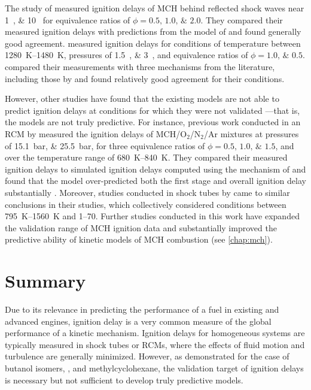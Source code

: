 \documentclass[../main.tex]{subfiles}
\begin{document}
The study of \textcite{Rotavera2013} measured ignition delays of MCH behind
reflected shock waves near \SIlist{1;10}{\atmosphere} for equivalence
ratios of $\phi = \numlist{0.5;1.0;2.0}$. They compared their measured ignition
delays with predictions from the model of \textcite{Pitz2007} and found
generally good agreement. \textcite{Hong2011} measured ignition delays
for conditions of temperature between \SIrange{1280}{1480}{\kelvin}, pressures
of \SIlist{1.5;3}{\atmosphere}, and equivalence ratios of $\phi = \numlist{1.0;0.5}$.
\textcite{Hong2011} compared their measurements with three mechanisms
from the literature, including those by \textcite{Pitz2007, Orme2006}
and found relatively good agreement for their conditions.

However, other studies have found that the existing models are not able
to predict ignition delays at conditions for which they were not validated%
---that is, the models are not truly predictive. For instance, previous work
conducted in an RCM by \textcite{Mittal2009} measured the ignition delays
of MCH/O$_2$/N$_2$/Ar mixtures at pressures of \SIlist{15.1;25.5}{\bar},
for three equivalence ratios of $\phi = \numlist{0.5;1.0;1.5}$, and over
the temperature range of \SIrange{680}{840}{\kelvin}. They compared
their measured ignition delays to simulated ignition delays computed
using the mechanism of \textcite{Pitz2007} and found that the model
over-predicted both the first stage and overall ignition delay substantially
\cite{Mittal2009}. Moreover, studies conducted in shock tubes by
\textcite{Vasu2009, Vanderover2009} came to similar conclusions in their
studies, which collectively considered conditions between \SIrange{795}{1560}{\kelvin}
and \SIrange{1}{70}{\atmosphere}. Further studies conducted in this work
have expanded the validation range of MCH ignition data and substantially
improved the predictive ability of kinetic models of MCH combustion (see
\autoref{chap:mch}).

\section{Summary}

Due to its relevance in predicting the performance of a fuel in existing
and advanced engines, ignition delay is a very common measure of the
global performance of a kinetic mechanism. Ignition delays for homogeneous
systems are typically measured in shock tubes or RCMs, where the effects
of fluid motion and turbulence are generally minimized. However, as demonstrated
for the case of butanol isomers, \iPeOH{}, and methylcyclohexane, the
validation target of ignition delays is necessary but not sufficient to
develop truly predictive models.
\end{document}
